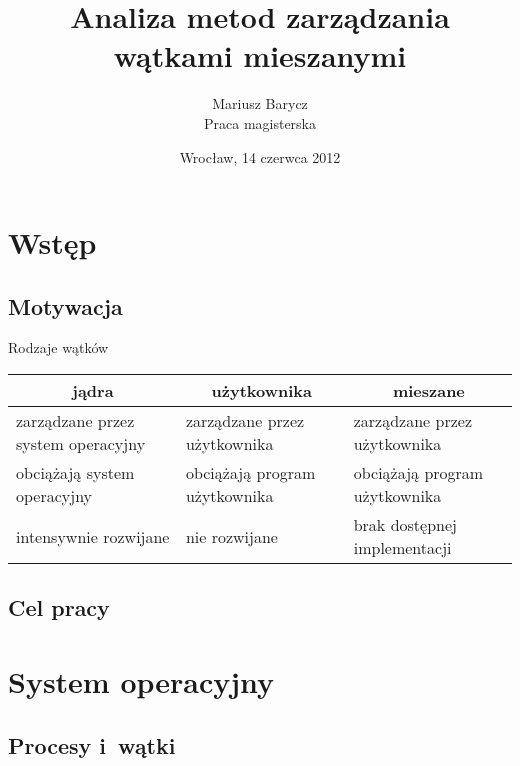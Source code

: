 \documentclass[10pt]{beamer}
\author[Mariusz Barycz]{Mariusz Barycz\\Praca magisterska}
\date{Wrocław, 14 czerwca 2012}
\title{Analiza metod zarządzania wątkami mieszanymi}
\begin{document}
\begin{frame}
\titlepage
\end{frame}

\section{Wstęp}
\subsection{Motywacja}
\frame
{
\begin{block}{Rodzaje wątków}
  \begin{center}
  \begin{tabular}{p{3cm}|p{3cm}|p{3cm}}
    \multicolumn{1}{c|}{\bf jądra} & \multicolumn{1}{c|}{\bf użytkownika} & \multicolumn{1}{c}{\bf mieszane} \\ \hline
    {zarządzane przez system operacyjny} & {zarządzane przez użytkownika} & {zarządzane przez użytkownika} \\ \hline
    obciążają system operacyjny & obciążają program użytkownika & obciążają program użytkownika \\ \hline
    intensywnie rozwijane & nie rozwijane & brak dostępnej implementacji \\
  \end{tabular}
\end{center}

\end{block}
}


\subsection{Cel pracy}

\section{System operacyjny}
\subsection{Procesy i~wątki}
\end{document}
